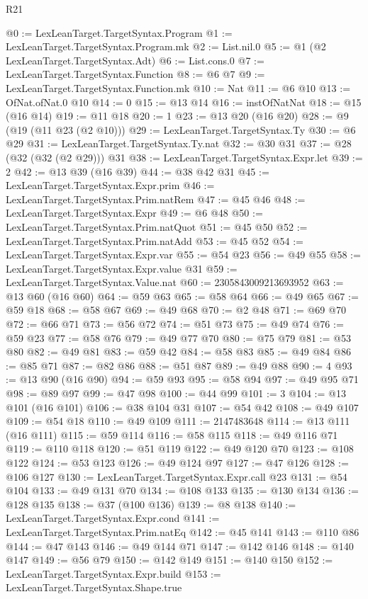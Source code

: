 \begin{lexlean}{R21}
\begin{coremodule}
@0 := LexLeanTarget.TargetSyntax.Program
@1 := LexLeanTarget.TargetSyntax.Program.mk
@2 := List.nil.{0}
@5 := @1 (@2 LexLeanTarget.TargetSyntax.Adt)
@6 := List.cons.{0}
@7 := LexLeanTarget.TargetSyntax.Function
@8 := @6 @7
@9 := LexLeanTarget.TargetSyntax.Function.mk
@10 := Nat
@11 := @6 @10
@13 := OfNat.ofNat.{0} @10
@14 := 0
@15 := @13 @14
@16 := instOfNatNat
@18 := @15 (@16 @14)
@19 := @11 @18
@20 := 1
@23 := @13 @20 (@16 @20)
@28 := @9 (@19 (@11 @23 (@2 @10)))
@29 := LexLeanTarget.TargetSyntax.Ty
@30 := @6 @29
@31 := LexLeanTarget.TargetSyntax.Ty.nat
@32 := @30 @31
@37 := @28 (@32 (@32 (@2 @29))) @31
@38 := LexLeanTarget.TargetSyntax.Expr.let
@39 := 2
@42 := @13 @39 (@16 @39)
@44 := @38 @42 @31
@45 := LexLeanTarget.TargetSyntax.Expr.prim
@46 := LexLeanTarget.TargetSyntax.Prim.natRem
@47 := @45 @46
@48 := LexLeanTarget.TargetSyntax.Expr
@49 := @6 @48
@50 := LexLeanTarget.TargetSyntax.Prim.natQuot
@51 := @45 @50
@52 := LexLeanTarget.TargetSyntax.Prim.natAdd
@53 := @45 @52
@54 := LexLeanTarget.TargetSyntax.Expr.var
@55 := @54 @23
@56 := @49 @55
@58 := LexLeanTarget.TargetSyntax.Expr.value @31
@59 := LexLeanTarget.TargetSyntax.Value.nat
@60 := 2305843009213693952
@63 := @13 @60 (@16 @60)
@64 := @59 @63
@65 := @58 @64
@66 := @49 @65
@67 := @59 @18
@68 := @58 @67
@69 := @49 @68
@70 := @2 @48
@71 := @69 @70
@72 := @66 @71
@73 := @56 @72
@74 := @51 @73
@75 := @49 @74
@76 := @59 @23
@77 := @58 @76
@79 := @49 @77 @70
@80 := @75 @79
@81 := @53 @80
@82 := @49 @81
@83 := @59 @42
@84 := @58 @83
@85 := @49 @84
@86 := @85 @71
@87 := @82 @86
@88 := @51 @87
@89 := @49 @88
@90 := 4
@93 := @13 @90 (@16 @90)
@94 := @59 @93
@95 := @58 @94
@97 := @49 @95 @71
@98 := @89 @97
@99 := @47 @98
@100 := @44 @99
@101 := 3
@104 := @13 @101 (@16 @101)
@106 := @38 @104 @31
@107 := @54 @42
@108 := @49 @107
@109 := @54 @18
@110 := @49 @109
@111 := 2147483648
@114 := @13 @111 (@16 @111)
@115 := @59 @114
@116 := @58 @115
@118 := @49 @116 @71
@119 := @110 @118
@120 := @51 @119
@122 := @49 @120 @70
@123 := @108 @122
@124 := @53 @123
@126 := @49 @124 @97
@127 := @47 @126
@128 := @106 @127
@130 := LexLeanTarget.TargetSyntax.Expr.call @23
@131 := @54 @104
@133 := @49 @131 @70
@134 := @108 @133
@135 := @130 @134
@136 := @128 @135
@138 := @37 (@100 @136)
@139 := @8 @138
@140 := LexLeanTarget.TargetSyntax.Expr.cond
@141 := LexLeanTarget.TargetSyntax.Prim.natEq
@142 := @45 @141
@143 := @110 @86
@144 := @47 @143
@146 := @49 @144 @71
@147 := @142 @146
@148 := @140 @147
@149 := @56 @79
@150 := @142 @149
@151 := @140 @150
@152 := LexLeanTarget.TargetSyntax.Expr.build
@153 := LexLeanTarget.TargetSyntax.Shape.true

\end{coremodule}
\end{lexlean}
